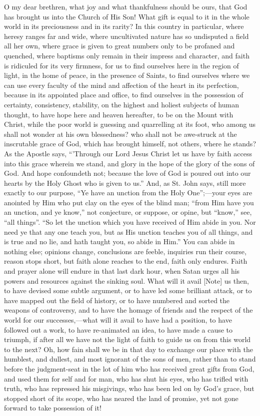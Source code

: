 O my dear brethren, what joy and what thankfulness should be ours,
that God has brought us into the Church of His Son! What gift is equal
to it in the whole world in its preciousness and in its rarity? In
this country in particular, where heresy ranges far and wide, where
uncultivated nature has so undisputed a field all her own, where grace
is given to great numbers only to be profaned and quenched, where
baptisms only remain in their impress and character, and faith is
ridiculed for its very firmness, for us to find ourselves here in the
region of light, in the home of peace, in the presence of Saints, to
find ourselves where we can use every faculty of the mind and
affection of the heart in its perfection, because in its appointed
place and office, to find ourselves in the possession of certainty,
consistency, stability, on the highest and holiest subjects of human
thought, to have hope here and heaven hereafter, to be on the Mount
with Christ, while the poor world is guessing and quarrelling at its
foot, who among us shall not wonder at his own blessedness? who shall
not be awe-struck at the inscrutable grace of God, which has brought
himself, not others, where he stands? As the Apostle says,
``'Through our Lord Jesus Christ let us have by faith access into
this grace wherein we stand, and glory in the hope of the glory of the
sons of God. And hope confoundeth not; because the love of God is
poured out into our hearts by the Holy Ghost who is given to us.''
And, as St. John says, still more exactly to our purpose, ``Ye
have an unction from the Holy One'';—your eyes are anointed by
Him who put clay on the eyes of the blind man; ``from Him have you
an unction, and ye know,'' not conjecture, or suppose, or opine,
but ``know,'' see, ``all things''. ``So let the
unction which you have received of Him abide in you. Nor need ye that
any one teach you, but as His unction teaches you of all things, and
is true and no lie, and hath taught you, so abide in Him.'' You
can abide in nothing else; opinions change, conclusions are feeble,
inquiries run their course, reason stops short, but faith alone
reaches to the end, faith only endures. Faith and prayer alone will
endure in that last dark hour, when Satan urges all his powers and
resources against the sinking soul. What will it avail [Note]
us then, to have devised some subtle argument, or to have led some
brilliant attack, or to have mapped out the field of history, or to
have numbered and sorted the weapons of controversy, and to have the
homage of friends and the respect of the world for our successes,—what
will it avail to have had a position, to have followed out a work, to
have re-animated an idea, to have made a cause to triumph, if after
all we have not the light of faith to guide us on from this world to
the next? Oh, how fain shall we be in that day to exchange our place
with the humblest, and dullest, and most ignorant of the sons of men,
rather than to stand before the judgment-seat in the lot of him who
has received great gifts from God, and used them for self and for man,
who has shut his eyes, who has trifled with truth, who has repressed
his misgivings, who has been led on by God's grace, but stopped short
of its scope, who has neared the land of promise, yet not gone forward
to take possession of it!

